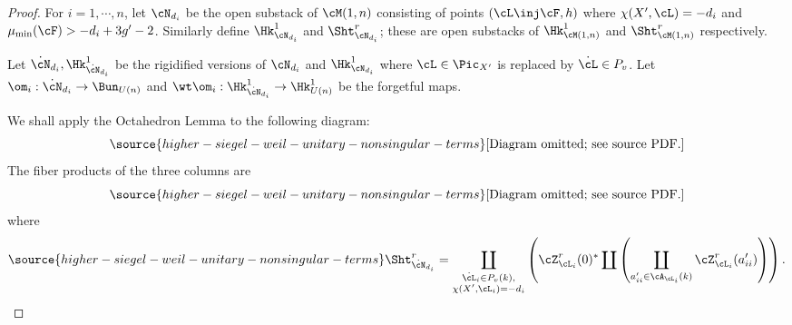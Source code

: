 \begin{proof}


For $i=1,\cdots, n$,  let $\cN_{d_{i}}$ be the open substack of $\cM(1,n)$ consisting of points $(\cL\inj \cF,h)$ where $\chi(X',\cL)=-d_{i}$ and $\mu_{\min}(\cF)>-d_{i}+3g'-2$. Similarly define $\Hk^{1}_{\cN_{d_{i}}}$ and $\Sht^{r}_{\cN_{d_{i}}}$; these are open substacks of $\Hk^1_{\cM(1,n)}$ and $\Sht^r_{\cM(1,n)}$ respectively.

Let $\dot\cN_{d_{i}}, \Hk^{1}_{\dot\cN_{d_{i}}}$ be the rigidified versions of $\cN_{d_{i}}$ and $\Hk^{1}_{\cN_{d_{i}}}$ where $\cL\in \Pic_{X'}$ is replaced by $\dot\cL\in P_{v}$. Let $\om_{i}: \dot\cN_{d_{i}}\to \Bun_{U(n)}$ and $\wt\om_{i}: \Hk^{1}_{\dot\cN_{d_{i}}}\to \Hk^{1}_{U(n)}$ be the forgetful maps.




We shall apply the Octahedron Lemma \cite[Theorem A.10]{YZ} to the following diagram:
\begin{equation}\label{9 term}
\source{higher-siegel-weil-unitary-nonsingular-terms}
\text{[Diagram omitted; see source PDF.]}
\end{equation}
The fiber products of the three columns are
\begin{equation}\label{col Sht}
\source{higher-siegel-weil-unitary-nonsingular-terms}
\text{[Diagram omitted; see source PDF.]}
\end{equation}
where
\begin{equation}\label{ShtN decomp}
\source{higher-siegel-weil-unitary-nonsingular-terms}
\Sht^{r}_{\dot\cN_{d_{i}}}=\coprod_{\substack{\dot\cL_{i}\in P_{v}(k), \\ \chi(X',\cL_{i})=-d_{i}}}\left(\cZ^{r}_{\cL_{i}}(0)^{*}\coprod\left(\coprod_{ a'_{ii}\in \cA_{\cL_{i}}(k)}\cZ^{r}_{\cL_{i}}(a'_{ii})\right)\right).
\end{equation}


\end{proof}
